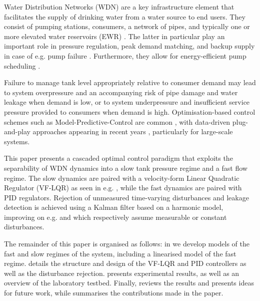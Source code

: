 
Water Distribution Networks (WDN) are a key infrastructure element that facilitates the supply of drinking water from a water source to end users. They consist of pumping stations, consumers, a network of pipes, and typically one or more elevated water reservoirs (EWR) \cite{Swamee2008}. The latter in particular play an important role in pressure regulation, peak demand matching, and backup supply in case of e.g. pump failure \cite{Creaco2019}. Furthermore, they allow for energy-efficient pump scheduling \cite{Rathore1030,Bello2019}.  

Failure to manage tank level appropriately relative to consumer demand may lead to system overpressure and an accompanying risk of pipe damage and water leakage when demand is low, or to system underpressure and insufficient service pressure provided to consumers when demand is high. Optimisation-based control schemes such as Model-Predictive-Control are common \cite{OcampoMartinez2013,Kallesoe2017}, with data-driven plug-and-play approaches appearing in recent years \cite{Val2020}, particularly for large-scale systems.  

This paper presents a cascaded optimal control paradigm that exploits the separability of WDN dynamics into a slow tank pressure regime and a fast flow regime. The slow dynamics are paired with a velocity-form Linear Quadratic Regulator (VF-LQR) as seen in e.g. \cite{Pannocchia2015a}, while the fast dynamics are paired with PID regulators. Rejection of unmeasured time-varying disturbances and leakage detection is achieved using a Kalman filter based on a harmonic model, improving on e.g. \cite{OcampoMartinez2013} and \cite{Val2020} which respectively assume measurable or constant disturbances.

The remainder of this paper is organised as follows: in  we develop models of the fast and slow regimes of the system, including a linearised model of the fast regime.  details the structure and design of the VF-LQR and PID controllers as well as the disturbance rejection.  presents experimental results, as well as an overview of the laboratory testbed. Finally,  reviews the results and presents ideas for future work, while  summarises the contributions made in the paper.
